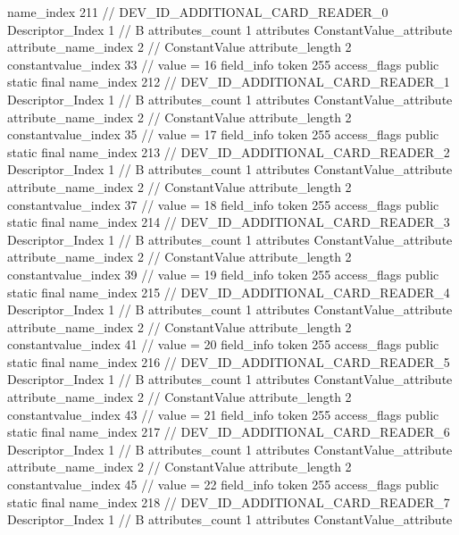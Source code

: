 {{{{{				name_index	211		// DEV_ID_ADDITIONAL_CARD_READER_0
				Descriptor_Index	1		// B
				attributes_count	1
				attributes {
				ConstantValue_attribute {
					attribute_name_index	2		// ConstantValue
					attribute_length	2
					constantvalue_index	33		// value = 16
				}
				}
			}
			field_info {
				token	255
				access_flags	public static final
				name_index	212		// DEV_ID_ADDITIONAL_CARD_READER_1
				Descriptor_Index	1		// B
				attributes_count	1
				attributes {
				ConstantValue_attribute {
					attribute_name_index	2		// ConstantValue
					attribute_length	2
					constantvalue_index	35		// value = 17
				}
				}
			}
			field_info {
				token	255
				access_flags	public static final
				name_index	213		// DEV_ID_ADDITIONAL_CARD_READER_2
				Descriptor_Index	1		// B
				attributes_count	1
				attributes {
				ConstantValue_attribute {
					attribute_name_index	2		// ConstantValue
					attribute_length	2
					constantvalue_index	37		// value = 18
				}
				}
			}
			field_info {
				token	255
				access_flags	public static final
				name_index	214		// DEV_ID_ADDITIONAL_CARD_READER_3
				Descriptor_Index	1		// B
				attributes_count	1
				attributes {
				ConstantValue_attribute {
					attribute_name_index	2		// ConstantValue
					attribute_length	2
					constantvalue_index	39		// value = 19
				}
				}
			}
			field_info {
				token	255
				access_flags	public static final
				name_index	215		// DEV_ID_ADDITIONAL_CARD_READER_4
				Descriptor_Index	1		// B
				attributes_count	1
				attributes {
				ConstantValue_attribute {
					attribute_name_index	2		// ConstantValue
					attribute_length	2
					constantvalue_index	41		// value = 20
				}
				}
			}
			field_info {
				token	255
				access_flags	public static final
				name_index	216		// DEV_ID_ADDITIONAL_CARD_READER_5
				Descriptor_Index	1		// B
				attributes_count	1
				attributes {
				ConstantValue_attribute {
					attribute_name_index	2		// ConstantValue
					attribute_length	2
					constantvalue_index	43		// value = 21
				}
				}
			}
			field_info {
				token	255
				access_flags	public static final
				name_index	217		// DEV_ID_ADDITIONAL_CARD_READER_6
				Descriptor_Index	1		// B
				attributes_count	1
				attributes {
				ConstantValue_attribute {
					attribute_name_index	2		// ConstantValue
					attribute_length	2
					constantvalue_index	45		// value = 22
				}
				}
			}
			field_info {
				token	255
				access_flags	public static final
				name_index	218		// DEV_ID_ADDITIONAL_CARD_READER_7
				Descriptor_Index	1		// B
				attributes_count	1
				attributes {
				ConstantValue_attribute {
}}}}}}}
